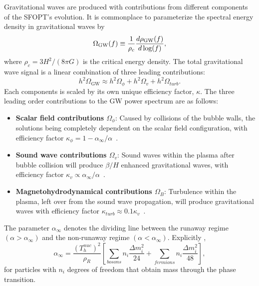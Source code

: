 \documentclass[nofootinbib,twocolumn,preprintnumbers]{revtex4-1}
\begin{document}
Gravitational waves are produced with contributions from different components of the SFOPT's evolution.  It is commonplace to parameterize the spectral energy density in gravitational waves by~\citep{PhysRevD.75.043507} 
\begin{equation}\label{eqn:SpectralEng}
\Omega_{\textrm{GW}} (f) \equiv \frac{1}{ \rho_{c}} \frac{d \rho_{\textrm{GW}}(f) }{d \textrm{\,log}(f)} , 
\end{equation}
where $\rho_{c} = 3H^2/(8 \pi G)$ is the critical energy density. The total gravitational wave signal is a linear combination of three leading contributions:
\begin{equation}
h^2\Omega_{\textrm{GW}} \approx h^2\Omega_{\phi} + h^2\Omega_{v} + h^2\Omega_{turb} .
\end{equation}
Each components is scaled by its own unique efficiency factor, $\kappa$. The three leading order contributions to the GW power spectrum are as follows:
\begin{itemize}
\item \textbf{Scalar field contributions $\Omega_{\phi}$}: Caused by collisions of the bubble walls, the solutions being completely dependent on the scalar field configuration, with efficiency factor $\kappa_{\phi} = 1 - \alpha_{\infty}/\alpha$~\citep{PhysRevD.45.4514, Huber_2008}. 
\item \textbf{Sound wave contributions $\Omega_{v}$}: Sound waves within the plasma after bubble collision will produce $\beta/H$ enhanced gravitational waves, with efficiency factor $\kappa_{v} \propto \alpha_{\infty}/\alpha$~\citep{PhysRevLett.112.041301}.
\item \textbf{Magnetohydrodynamical contributions $\Omega_{B}$}: Turbulence within the plasma, left over from the sound wave propagation, will produce gravitational waves with efficiency factor $\kappa_{
turb} \approx 0.1 \kappa_{v} $~\citep{PhysRevD.74.063521}.
\end{itemize}
The parameter $\alpha_{\infty}$ denotes the dividing line between the runaway regime  $(\alpha >\alpha_{\infty})$ and the non-runaway regime $(\alpha <\alpha_{\infty})$. Explicitly \cite{Breitbach:2018ddu, Caprini:2015zlo, Espinosa:2010hh}, 
\begin{equation}\label{eqn:critPTstrength}
\alpha_{\infty} = \frac{(T^{nuc}_h)^2}{\rho_R}\left[\sum_{bosons} n_i\frac{\Delta m^2_i}{24} + \sum_{fermions} n_i\frac{\Delta m_i^2}{48}\right],
\end{equation} 
for particles with $n_i$ degrees of freedom that obtain mass through the phase transition. 
\end{document}
